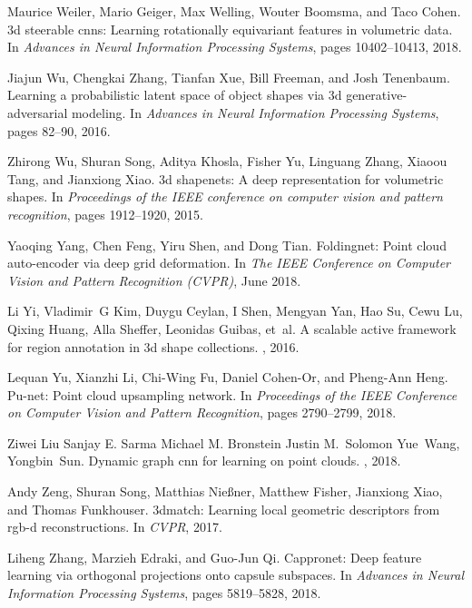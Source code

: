 \documentclass[10pt,twocolumn,letterpaper]{article}
\theoremstyle{break}
\begin{document}
{\begin{thebibliography}{10}
Maurice Weiler, Mario Geiger, Max Welling, Wouter Boomsma, and Taco Cohen.
\newblock 3d steerable cnns: Learning rotationally equivariant features in
  volumetric data.
\newblock In {\em Advances in Neural Information Processing Systems}, pages
  10402--10413, 2018.

Jiajun Wu, Chengkai Zhang, Tianfan Xue, Bill Freeman, and Josh Tenenbaum.
\newblock Learning a probabilistic latent space of object shapes via 3d
  generative-adversarial modeling.
\newblock In {\em Advances in Neural Information Processing Systems}, pages
  82--90, 2016.

Zhirong Wu, Shuran Song, Aditya Khosla, Fisher Yu, Linguang Zhang, Xiaoou Tang,
  and Jianxiong Xiao.
\newblock 3d shapenets: A deep representation for volumetric shapes.
\newblock In {\em Proceedings of the IEEE conference on computer vision and
  pattern recognition}, pages 1912--1920, 2015.

Yaoqing Yang, Chen Feng, Yiru Shen, and Dong Tian.
\newblock Foldingnet: Point cloud auto-encoder via deep grid deformation.
\newblock In {\em The IEEE Conference on Computer Vision and Pattern
  Recognition (CVPR)}, June 2018.

Li Yi, Vladimir~G Kim, Duygu Ceylan, I Shen, Mengyan Yan, Hao Su, Cewu Lu,
  Qixing Huang, Alla Sheffer, Leonidas Guibas, et~al.
\newblock A scalable active framework for region annotation in 3d shape
  collections.
, 2016.

Lequan Yu, Xianzhi Li, Chi-Wing Fu, Daniel Cohen-Or, and Pheng-Ann Heng.
\newblock Pu-net: Point cloud upsampling network.
\newblock In {\em Proceedings of the IEEE Conference on Computer Vision and
  Pattern Recognition}, pages 2790--2799, 2018.

Ziwei Liu Sanjay E. Sarma Michael M. Bronstein Justin M.~Solomon Yue~Wang,
  Yongbin~Sun.
\newblock Dynamic graph cnn for learning on point clouds.
, 2018.

Andy Zeng, Shuran Song, Matthias Nie{\ss}ner, Matthew Fisher, Jianxiong Xiao,
  and Thomas Funkhouser.
\newblock 3dmatch: Learning local geometric descriptors from rgb-d
  reconstructions.
\newblock In {\em CVPR}, 2017.

Liheng Zhang, Marzieh Edraki, and Guo-Jun Qi.
\newblock Cappronet: Deep feature learning via orthogonal projections onto
  capsule subspaces.
\newblock In {\em Advances in Neural Information Processing Systems}, pages
  5819--5828, 2018.


\end{thebibliography}}
\end{document}
